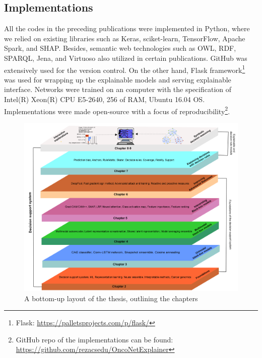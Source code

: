 \subsection{Implementations}
All the codes in the preceding publications were implemented in Python, where we relied on existing libraries such as Keras, sciket-learn, TensorFlow, Apache Spark, and SHAP. %
Besides, semantic web technologies such as OWL, RDF, SPARQL, Jena, and Virtuoso also utilized in certain publications. GitHub was extensively used for the  version control. On the other hand, Flask framework\footnote{Flask: \url{https://palletsprojects.com/p/flask/}} was used for wrapping up the explainable models and serving  explainable interface. Networks were trained on an computer with the specification of Intel(R) Xeon(R) CPU E5-2640, 256 of RAM, Ubuntu 16.04 OS. Implementations were made open-source with a focus of reproducibility\footnote{GitHub repo of the implementations can be found: \url{https://github.com/rezacsedu/OncoNetExplainer}}.

\begin{figure}
	\centering
		\includegraphics[scale=0.6]{images/chapter_outline.png}
		\caption{A bottom-up layout of the thesis, outlining the chapters}
        \label{fig:chapter_organization}
\end{figure}

